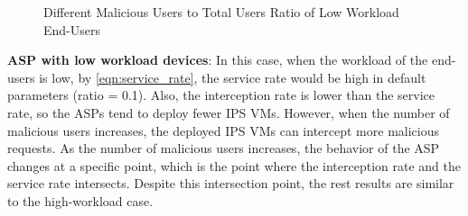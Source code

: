 \documentclass[10pt,journal, compsoc]{IEEEtran}
\begin{document}
\begin{figure}[!]
\captionsetup{justification=centering}
  \hfill
  \hfill
\label{fig:ratio_low}
\caption{Different Malicious Users to Total Users Ratio of Low Workload End-Users}
\end{figure}


\textbf{ASP with low workload devices}: In this case, when the workload of the end-users is low, by \cref{eqn:service_rate}, the service rate would be high in default parameters (ratio = 0.1). Also, the interception rate is lower than the service rate, so the ASPs tend to deploy fewer IPS VMs. However, when the number of malicious users increases, the deployed IPS VMs can intercept more malicious requests. As the number of malicious users increases, the behavior of the ASP changes at a specific point, which is the point where the interception rate and the service rate intersects. Despite this intersection point, the rest results are similar to the high-workload case.


\end{document}
